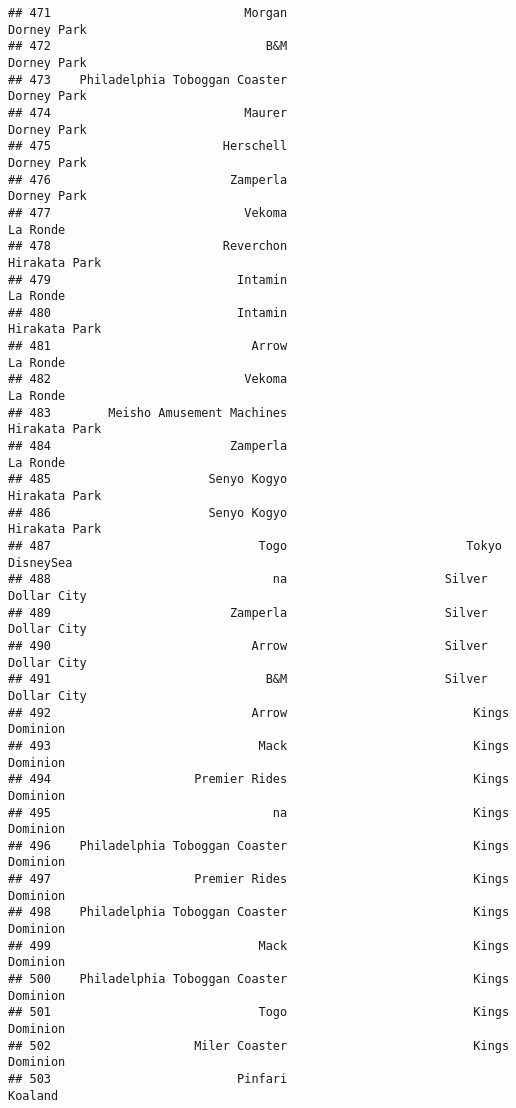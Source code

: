 \documentclass[
]{article}
\begin{document}
\begin{verbatim}
## 471                           Morgan                             Dorney Park
## 472                              B&M                             Dorney Park
## 473    Philadelphia Toboggan Coaster                             Dorney Park
## 474                           Maurer                             Dorney Park
## 475                        Herschell                             Dorney Park
## 476                         Zamperla                             Dorney Park
## 477                           Vekoma                                La Ronde
## 478                        Reverchon                           Hirakata Park
## 479                          Intamin                                La Ronde
## 480                          Intamin                           Hirakata Park
## 481                            Arrow                                La Ronde
## 482                           Vekoma                                La Ronde
## 483        Meisho Amusement Machines                           Hirakata Park
## 484                         Zamperla                                La Ronde
## 485                      Senyo Kogyo                           Hirakata Park
## 486                      Senyo Kogyo                           Hirakata Park
## 487                             Togo                         Tokyo DisneySea
## 488                               na                      Silver Dollar City
## 489                         Zamperla                      Silver Dollar City
## 490                            Arrow                      Silver Dollar City
## 491                              B&M                      Silver Dollar City
## 492                            Arrow                          Kings Dominion
## 493                             Mack                          Kings Dominion
## 494                    Premier Rides                          Kings Dominion
## 495                               na                          Kings Dominion
## 496    Philadelphia Toboggan Coaster                          Kings Dominion
## 497                    Premier Rides                          Kings Dominion
## 498    Philadelphia Toboggan Coaster                          Kings Dominion
## 499                             Mack                          Kings Dominion
## 500    Philadelphia Toboggan Coaster                          Kings Dominion
## 501                             Togo                          Kings Dominion
## 502                    Miler Coaster                          Kings Dominion
## 503                          Pinfari                                 Koaland

\end{verbatim}
\end{document}
